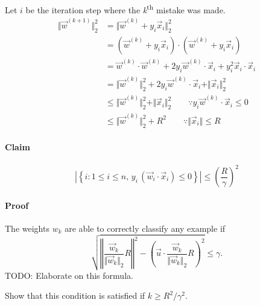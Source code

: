 Let $i$ be the iteration step where the \emph{k}\textsuperscript{th}
mistake was made.
\begin{align*}
\Vert\vec{w}^{(k+1)}\Vert_{2}^{2} & =\Vert\vec{w}^{(k)}+y_{i}\vec{x}_{i}\Vert_{2}^{2}\\
 & =\left(\vec{w}^{(k)}+y_{i}\vec{x}_{i}\right)\cdot\left(\vec{w}^{(k)}+y_{i}\vec{x}_{i}\right)\\
 & =\vec{w}^{(k)}\cdot\vec{w}^{(k)}+2y_{i}\vec{w}^{(k)}\cdot\vec{x}_{i}+y_{i}^{2}\vec{x}_{i}\cdot\vec{x}_{i}\\
 & =\Vert\vec{w}^{(k)}\Vert_{2}^{2}+2y_{i}\vec{w}^{(k)}\cdot\vec{x}_{i}+\Vert\vec{x}_{i}\Vert_{2}^{2}\\
 & \leq\Vert\vec{w}^{(k)}\Vert_{2}^{2}+\Vert\vec{x}_{i}\Vert_{2}^{2}\qquad\because y_{i}\vec{w}^{(k)}\cdot\vec{x}_{i}\leq0\\
 & \leq\Vert\vec{w}^{(k)}\Vert_{2}^{2}+R^{2}\qquad\because\Vert\vec{x}_{i}\Vert\leq R
\end{align*}



\paragraph*{Claim}

\[
\left|\left\{ i:1\le i\le n,\, y_{i}\,(\vec{w}_{i}\cdot\vec{x}_{i})\leq0\right\} \right|\leq\left(\frac{R}{\gamma}\right)^{2}
\]



\paragraph*{Proof}

The weights $w_{k}$ are able to correctly classify any example if
\[
\sqrt{\left\Vert \frac{\vec{w}_{k}}{\Vert\vec{w}_{k}\Vert_{2}}R\right\Vert ^{2}-\left(\vec{u}\cdot\frac{\vec{w}_{k}}{\Vert\vec{w}_{k}\Vert_{2}}R\right)^{2}}\leq\gamma.
\]
TODO: Elaborate on this formula. 

Show that this condition is satisfied if $k\geq R^{2}/\gamma^{2}$.

